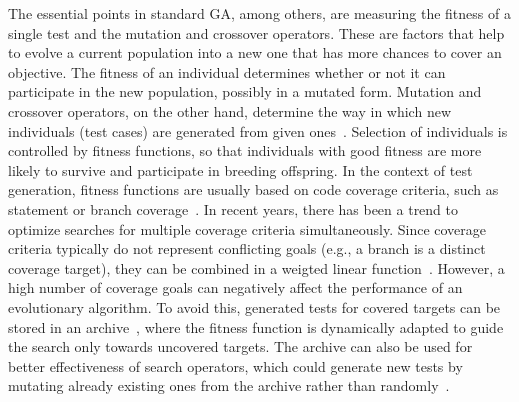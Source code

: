 \documentclass{article}
\begin{document}
The essential points in standard \ac{GA}, among others, are measuring the fitness of a single test and the mutation and crossover operators. These are factors that help to evolve a current population into a new one that has more chances to cover an objective. The fitness of an individual determines whether or not it can participate in the new population, possibly in a mutated form. Mutation and crossover operators, on the other hand, determine the way in which new individuals (test cases) are generated from given ones~\cite{Tonella2004}. Selection of individuals is controlled by fitness functions, so that individuals with good fitness are more likely to survive and participate in breeding offspring. In the context of test generation, fitness functions are usually based on code coverage criteria, such as statement or branch coverage~\cite{Panichella2018}. In recent years, there has been a trend to optimize searches for multiple coverage criteria simultaneously. Since coverage criteria typically do not represent conflicting goals (e.g., a branch is a distinct coverage target), they can be combined in a weigted linear function~\cite{Rojas2015}. However, a high number of coverage goals can negatively affect the performance of an evolutionary algorithm. To avoid this, generated tests for covered targets can be stored in an archive~\cite{Rojas2017}, where the fitness function is dynamically adapted to guide the search only towards uncovered targets. The archive can also be used for better effectiveness of search operators, which could generate new tests by mutating already existing ones from the archive rather than randomly~\cite{Campos2017}. 
\end{document}

